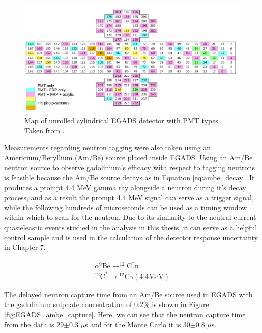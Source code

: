 \begin{figure}[H]
    \includegraphics[width=\textwidth]{Figures/egads_pmt_map.png}
\caption{Map of unrolled cylindrical EGADS detector with PMT types. Taken from \cite{martiEvaluationGadoliniumAction2020}.}
\label{fig:EGADS_PMT}
\end{figure}

Measurements regarding neutron tagging were also taken using an Americium/Beryllium (Am/Be) source placed inside EGADS. Using an Am/Be neutron source to observe gadolinium's efficacy with respect to tagging neutrons is feasible because the Am/Be source decays as in Equation \ref{eq:ambe_decay}. It produces a prompt 4.4 MeV gamma ray alongside a neutron during it's decay process, and as a result the prompt 4.4 MeV signal can serve as a trigger signal, while the following hundreds of microseconds can be used as a timing window within which to scan for the neutron. Due to its similarity to the neutral current quasieleastic events studied in the analysis in this thesis, it can serve as a helpful control sample and is used in the calculation of the detector response uncertainty in Chapter 7.

\begin{equation}
\begin{array}{c}
\alpha^{9} \mathrm{Be} \longrightarrow^{12} \mathrm{C}^{*} \mathrm{n} \\
{ }^{12} \mathrm{C}^{*} \longrightarrow{ }^{12} \mathrm{C} \gamma(4.4 \mathrm{MeV})
\end{array}
\label{eq:ambe_decay}
\end{equation}

The delayed neutron capture time from an Am/Be source used in EGADS with the gadolinium sulphate concentration of 0.2\% is shown in Figure \ref{fig:EGADS_ambe_capture}. Here, we can see that the neutron capture time from the data is 29$\pm$0.3 $\mu$s and for the Monte Carlo it is 30$\pm$0.8 $\mu$s.

